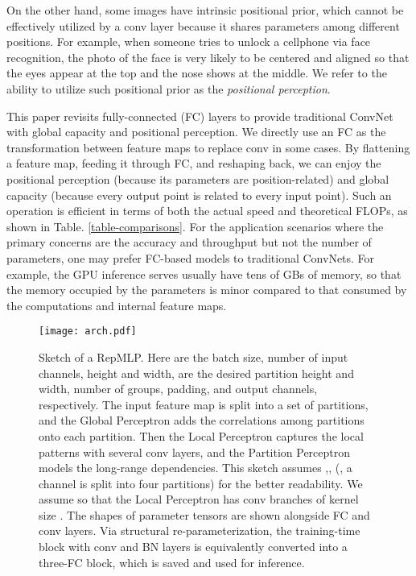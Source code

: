\documentclass[10pt,twocolumn,letterpaper]{article}
\begin{document}
On the other hand, some images have intrinsic positional prior, which cannot be effectively utilized by a conv layer because it shares parameters among different positions. For example, when someone tries to unlock a cellphone via face recognition, the photo of the face is very likely to be centered and aligned so that the eyes appear at the top and the nose shows at the middle. We refer to the ability to utilize such positional prior as the \textit{positional perception}.

This paper revisits fully-connected (FC) layers to provide traditional ConvNet with global capacity and positional perception. We directly use an FC as the transformation between feature maps to replace conv in some cases. By flattening a feature map, feeding it through FC, and reshaping back, we can enjoy the positional perception (because its parameters are position-related) and global capacity (because every output point is related to every input point). Such an operation is efficient in terms of both the actual speed and theoretical FLOPs, as shown in Table. \ref{table-comparisons}. For the application scenarios where the primary concerns are the accuracy and throughput but not the number of parameters, one may prefer FC-based models to traditional ConvNets. For example, the GPU inference serves usually have tens of GBs of memory, so that the memory occupied by the parameters is minor compared to that consumed by the computations and internal feature maps.
\begin{figure*}
	\begin{center}
		\texttt{[image: arch.pdf]}
		\vspace{-0.25in}
		\caption{Sketch of a RepMLP. Here  are the batch size, number of input channels, height and width,  are the desired partition height and width, number of groups, padding, and output channels, respectively. The input feature map is split into a set of partitions, and the Global Perceptron adds the correlations among partitions onto each partition. Then the Local Perceptron captures the local patterns with several conv layers, and the Partition Perceptron models the long-range dependencies. This sketch assumes ,, (\ie, a channel is split into four partitions) for the better readability. We assume  so that the Local Perceptron has conv branches of kernel size . The shapes of parameter tensors are shown alongside FC and conv layers. Via structural re-parameterization, the training-time block with conv and BN layers is equivalently converted into a three-FC block, which is saved and used for inference.}
		\label{fig-arch}
		\vspace{-0.25in}
	\end{center}
\end{figure*}
\end{document}
